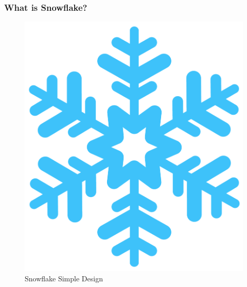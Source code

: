 \begin{frame}
	\frametitle{What is Snowflake?}
	\begin{figure}
		\includegraphics[scale=0.5]{Ch01-Introduction-data-management/12-Data-Model/04-Data-Model-Schema-Types/Figures/Snowflakes-PNG-File.png}
		\caption{Snowflake Simple Design}
	\end{figure}
\end{frame}
